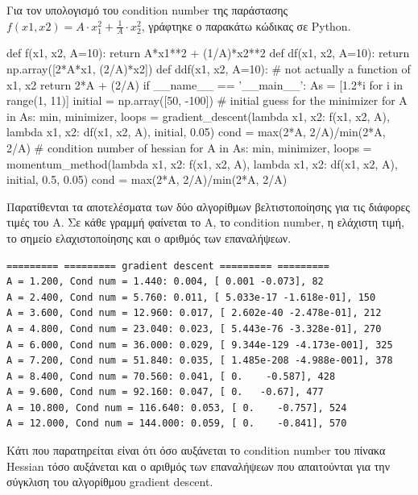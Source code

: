 \documentclass{article}
\newcommand{\eng}[1]{\foreignlanguage{english}{#1}} %
\begin{document}
Για τον υπολογισμό του \eng{condition number} της παράστασης $f(x1, x2) = A
\cdot x_1^2 + \frac{1}{A} \cdot x_2^2$, γράφτηκε ο παρακάτω κώδικας σε
\eng{Python}.

\begin{python}
def f(x1, x2, A=10):
    return A*x1**2 + (1/A)*x2**2
def df(x1, x2, A=10):
    return np.array([2*A*x1, (2/A)*x2])
def ddf(x1, x2, A=10): # not actually a function of x1, x2
    return 2*A + (2/A)
if __name__ == '__main__':
    As = [1.2*i for i in range(1, 11)]
    initial = np.array([50, -100]) # initial guess for the minimizer
    for A in As:
        min, minimizer, loops = gradient_descent(lambda x1, x2: f(x1, x2, A),
                                                 lambda x1, x2: df(x1, x2, A),
                                                 initial, 0.05)
        cond = max(2*A, 2/A)/min(2*A, 2/A) # condition number of hessian
    for A in As:
        min, minimizer, loops = momentum_method(lambda x1, x2: f(x1, x2, A),
                                                lambda x1, x2: df(x1, x2, A),
                                                initial, 0.5, 0.05)
        cond = max(2*A, 2/A)/min(2*A, 2/A)
\end{python}

Παρατίθενται τα αποτελέσματα των δύο αλγορίθμων βελτιστοποίησης για τις
διάφορες τιμές του Α. Σε κάθε γραμμή φαίνεται το Α, το \eng{condition number},
η ελάχιστη τιμή, το σημείο ελαχιστοποίησης και ο αριθμός των επαναλήψεων.

\begin{verbatim}
========= ========= gradient descent ========= =========
A = 1.200, Cond num = 1.440: 0.004, [ 0.001 -0.073], 82
A = 2.400, Cond num = 5.760: 0.011, [ 5.033e-17 -1.618e-01], 150
A = 3.600, Cond num = 12.960: 0.017, [ 2.602e-40 -2.478e-01], 212
A = 4.800, Cond num = 23.040: 0.023, [ 5.443e-76 -3.328e-01], 270
A = 6.000, Cond num = 36.000: 0.029, [ 9.344e-129 -4.173e-001], 325
A = 7.200, Cond num = 51.840: 0.035, [ 1.485e-208 -4.988e-001], 378
A = 8.400, Cond num = 70.560: 0.041, [ 0.    -0.587], 428
A = 9.600, Cond num = 92.160: 0.047, [ 0.   -0.67], 477
A = 10.800, Cond num = 116.640: 0.053, [ 0.    -0.757], 524
A = 12.000, Cond num = 144.000: 0.059, [ 0.    -0.841], 570
\end{verbatim}

Κάτι που παρατηρείται είναι ότι όσο αυξάνεται το \eng{condition number} του
πίνακα \eng{Hessian} τόσο αυξάνεται και ο αριθμός των επαναλήψεων που
απαιτούνται για την σύγκλιση του αλγορίθμου \eng{gradient descent}.
\end{document}
